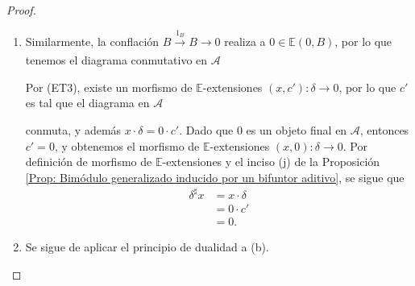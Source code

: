 \documentclass[tesis]{subfiles}
\begin{document}
\begin{proof}
\begin{enumerate}[label=(\alph*)]
        \item Similarmente, la conflación $B\xrightarrow[]{1_B}B\to 0$ realiza a $0\in\mathbb{E}(0,B)$, por lo que tenemos el diagrama conmutativo en $\mathscr{A}$
            \begin{center}
            \end{center}
            Por (ET3), existe un morfismo de $\mathbb{E}$-extensiones $(x,c'):\delta\to 0$, por lo que $c'$ es tal que el diagrama en $\mathscr{A}$
            \begin{center}
            \end{center}
            conmuta, y además $x\cdot\delta = 0\cdot c'$. Dado que $0$ es un objeto final en $\mathscr{A}$, entonces $c'=0$, y obtenemos el morfismo de $\mathbb{E}$-extensiones $(x,0):\delta\to 0$. Por definición de morfismo de $\mathbb{E}$-extensiones y el inciso (j) de la Proposición \ref{Prop: Bimódulo generalizado inducido por un bifuntor aditivo}, se sigue que
            \begin{align*}
                \delta^\sharp x &= x\cdot\delta \\
                                &= 0\cdot c' \\
                                &= 0.
            \end{align*}

        \item Se sigue de aplicar el principio de dualidad a (b).
    \end{enumerate}
\end{proof}
\end{document}
